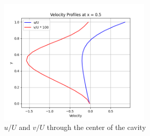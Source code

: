\documentclass[11pt]{article}
\begin{document}
\begin{figure}[H]
   \centering
   \includegraphics[width=0.65\textwidth]{images/center_velocity.png}
   \caption{$u/U$ and $v/U$ through the center of the cavity}
   \label{originaluv}
\end{figure}
\end{document}

